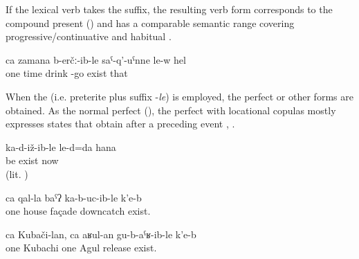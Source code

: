 If the lexical verb takes the  suffix, the resulting verb form corresponds to the compound present () and has a comparable semantic range covering progressive\slash continuative  and habitual .

\begin{exe}
	\ex	\label{ex:One time he comes home drunk}
	\gll	ca	zamana	b-erčː-ib-le	saˁ-q'-uˁnne	le-w	hel\\
		one	time	drink	-go	exist	that\\
	\glt	{}
\end{exe}



When the  (i.e. preterite plus suffix -\textit{le}) is employed, the perfect or other forms are obtained. As the normal perfect (), the perfect with locational copulas mostly expresses states that obtain after a preceding event , .

\begin{exe}
	\ex	\label{ex:‎(Then I relaxed) and we lived normally}
	\gll	ka-d-iž-ib-le	le-d=da	hana\\
		be	exist	now\\
	\glt	{} (lit. )

	\ex	\label{ex:(The plant) has covered one wall of the house (by growing upwards).}
	\gll	ca	qal-la	baˁʔ	ka-b-uc-ib-le	k'e-b\\
		one	house	façade	downcatch	exist.\\
	\glt	{}
	
		\ex	\label{ex:‎One Kubachi person, one Agul person are buried (in Sanzhi)}
	\gll	ca	Kubači-lan,	ca	aʁul-an	gu-b-aˁʁ-ib-le	k'e-b\\
		one	Kubachi	one	Agul	release	exist.\\
	\glt	{}
\end{exe}


